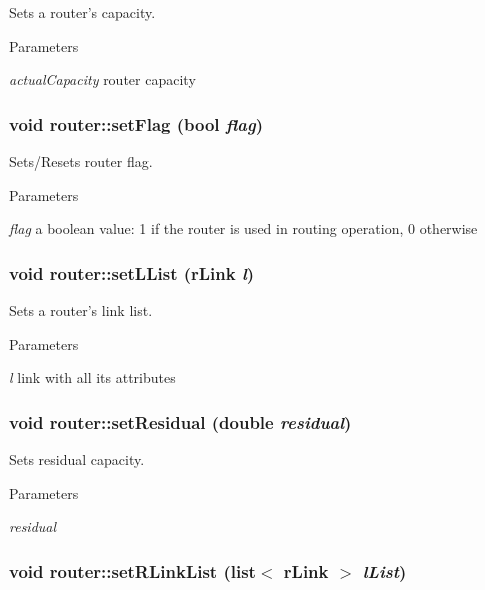 Sets a router's capacity. 


\begin{DoxyParams}{Parameters}
\item[{\em actualCapacity}]router capacity \end{DoxyParams}
\hypertarget{classrouter_ab4e2af9a6d0412fa8d3e6cea8b411f7c}{
\subsubsection[{setFlag}]{\setlength{\rightskip}{0pt plus 5cm}void router::setFlag (bool {\em flag})}}
\label{classrouter_ab4e2af9a6d0412fa8d3e6cea8b411f7c}


Sets/Resets router flag. 


\begin{DoxyParams}{Parameters}
\item[{\em flag}]a boolean value: 1 if the router is used in routing operation, 0 otherwise \end{DoxyParams}
\hypertarget{classrouter_a20f58c16edd3ca8d8afb73cf9f27f549}{
\subsubsection[{setLList}]{\setlength{\rightskip}{0pt plus 5cm}void router::setLList ({\bf rLink} {\em l})}}
\label{classrouter_a20f58c16edd3ca8d8afb73cf9f27f549}


Sets a router's link list. 


\begin{DoxyParams}{Parameters}
\item[{\em l}]link with all its attributes \end{DoxyParams}
\hypertarget{classrouter_ac839466bae2c42cee73a33b4d185f48a}{
\subsubsection[{setResidual}]{\setlength{\rightskip}{0pt plus 5cm}void router::setResidual (double {\em residual})}}
\label{classrouter_ac839466bae2c42cee73a33b4d185f48a}


Sets residual capacity. 


\begin{DoxyParams}{Parameters}
\item[{\em residual}]\end{DoxyParams}
\hypertarget{classrouter_a28908a05b7e50a0ab45481c94c8042a8}{
\subsubsection[{setRLinkList}]{\setlength{\rightskip}{0pt plus 5cm}void router::setRLinkList (list$<$ {\bf rLink} $>$ {\em lList})}}
\label{classrouter_a28908a05b7e50a0ab45481c94c8042a8}


